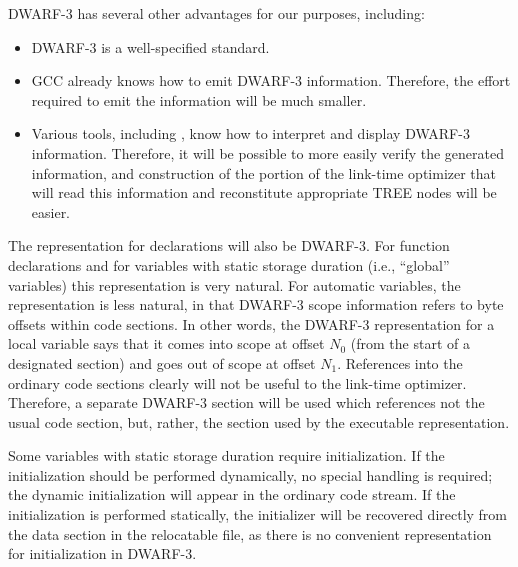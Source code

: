DWARF-3 has several other advantages for our purposes, including:
\begin{itemize}
\item DWARF-3 is a well-specified standard.

\item GCC already knows how to emit DWARF-3 information.  Therefore,
  the effort required to emit the information will be much smaller.

\item Various tools, including , know how to interpret
  and display DWARF-3 information.  Therefore, it will be possible to
  more easily verify the generated information, and construction of the
  portion of the link-time optimizer that will read this information
  and reconstitute appropriate TREE nodes will be easier.
\end{itemize}

The representation for declarations will also be DWARF-3.  For
function declarations and for variables with static storage duration
(i.e., ``global'' variables) this representation is very natural.  For
automatic variables, the representation is less natural, in that
DWARF-3 scope information refers to byte offsets within code sections.
In other words, the DWARF-3 representation for a local variable says
that it comes into scope at offset $N_0$ (from the start of a
designated section) and goes out of scope at offset $N_1$.  References
into the ordinary code sections clearly will not be useful to the
link-time optimizer.  Therefore, a separate DWARF-3 section will be
used which references not the usual code section, but, rather, the
section used by the executable representation.

Some variables with static storage duration require initialization.
If the initialization should be performed dynamically, no special
handling is required; the dynamic initialization will appear in the
ordinary code stream.  If the initialization is performed statically,
the initializer will be recovered directly from the data section in
the relocatable file, as there is no convenient representation for
initialization in DWARF-3.


